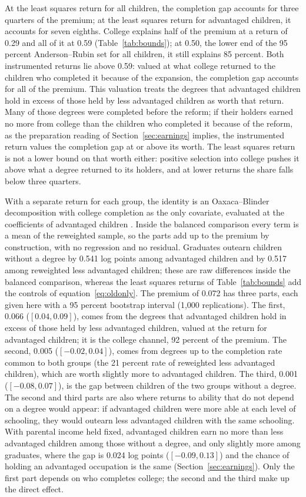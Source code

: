 \documentclass[11pt]{article}
\begin{document}
At the least squares return for all children, the completion gap accounts for three quarters of the premium; at the least squares return for advantaged children, it accounts for seven eighths. College explains half of the premium at a return of 0.29 and all of it at 0.59 (Table~\ref{tab:bounds}); at 0.50, the lower end of the 95 percent Anderson--Rubin set for all children, it still explains 85 percent. Both instrumented returns lie above 0.59: valued at what college returned to the children who completed it because of the expansion, the completion gap accounts for all of the premium. This valuation treats the degrees that advantaged children hold in excess of those held by less advantaged children as worth that return. Many of those degrees were completed before the reform; if their holders earned no more from college than the children who completed it because of the reform, as the preparation reading of Section~\ref{sec:earnings} implies, the instrumented return values the completion gap at or above its worth. The least squares return is not a lower bound on that worth either: positive selection into college pushes it above what a degree returned to its holders, and at lower returns the share falls below three quarters.

With a separate return for each group, the identity is an Oaxaca--Blinder decomposition with college completion as the only covariate, evaluated at the coefficients of advantaged children \citep{Oaxaca1973, Blinder1973}. Inside the balanced comparison every term is a mean of the reweighted sample, so the parts add up to the premium by construction, with no regression and no residual. Graduates outearn children without a degree by 0.541 log points among advantaged children and by 0.517 among reweighted less advantaged children; these are raw differences inside the balanced comparison, whereas the least squares returns of Table~\ref{tab:bounds} add the controls of equation~\eqref{eq:oldonly}. The premium of 0.072 has three parts, each given here with a 95 percent bootstrap interval (1,000 replications). The first, 0.066 ($[0.04, 0.09]$), comes from the degrees that advantaged children hold in excess of those held by less advantaged children, valued at the return for advantaged children;
it is the college channel, 92 percent of the premium. The second, 0.005 ($[-0.02, 0.04]$), comes from degrees up to the completion rate common to both groups (the 21 percent rate of reweighted less advantaged children), which are worth slightly more to advantaged children. The third, 0.001 ($[-0.08, 0.07]$), is the gap between children of the two groups without a degree. The second and third parts are also where returns to ability that do not depend on a degree would appear: if advantaged children were more able at each level of schooling, they would outearn less advantaged children with the same schooling. With parental income held fixed, advantaged children earn no more than less advantaged children among those without a degree, and only slightly more among graduates, where the gap is 0.024 log points ($[-0.09, 0.13]$) and the chance of holding an advantaged occupation is the same (Section~\ref{sec:earnings}). Only the first part depends on who completes college; the second and the third make up the direct effect.
\end{document}
